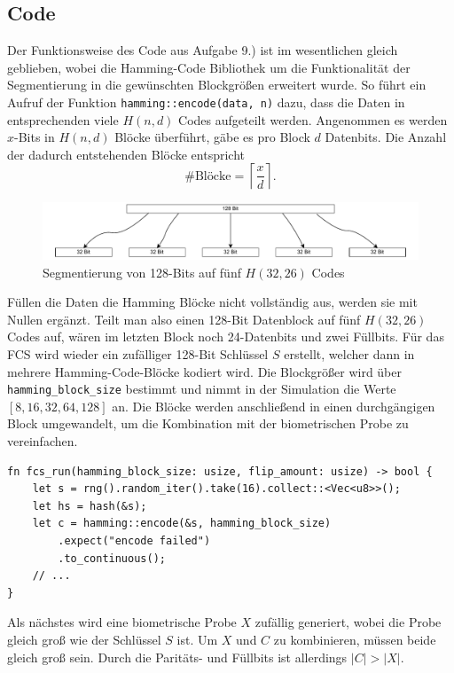 \documentclass{article}
\begin{document}
    \subsection{Code}
    Der Funktionsweise des Code aus Aufgabe 9.) ist im wesentlichen gleich geblieben, wobei die Hamming-Code Bibliothek um die 
    Funktionalität der Segmentierung in die gewünschten Blockgrößen erweitert wurde. So führt ein Aufruf
    der Funktion \verb|hamming::encode(data, n)| dazu, dass die Daten in entsprechenden viele $H(n,d)$ Codes
    aufgeteilt werden. Angenommen es werden $x$-Bits in $H(n,d)$ Blöcke überführt, gäbe es pro Block $d$ Datenbits.
    Die Anzahl der dadurch entstehenden Blöcke entspricht
    \begin{equation} \label{eq:1}
        \#\text{Blöcke}=\left\lceil\frac{x}{d}\right\rceil.
    \end{equation}
    \begin{figure}[h]
        \includegraphics[width=\textwidth]{img/segmentation.pdf}
        \caption{Segmentierung von 128-Bits auf fünf $H(32,26)$ Codes}
        \label{fig:segmentation}
    \end{figure}
    Füllen die Daten die Hamming Blöcke nicht vollständig aus, werden sie mit Nullen ergänzt. Teilt man also einen
    128-Bit Datenblock auf fünf $H(32,26)$ Codes auf, wären im letzten Block noch 24-Datenbits und zwei Füllbits.
    Für das FCS wird wieder ein zufälliger 128-Bit Schlüssel $S$ erstellt, welcher dann in mehrere Hamming-Code-Blöcke kodiert wird.
    Die Blockgrößer wird über \verb|hamming_block_size| bestimmt und nimmt in der Simulation die Werte $\left[8,16,32,64,128\right]$
    an. Die Blöcke werden anschließend in einen durchgängigen Block umgewandelt, um die Kombination mit der biometrischen Probe
    zu vereinfachen.
    \begin{verbatim}
fn fcs_run(hamming_block_size: usize, flip_amount: usize) -> bool {
    let s = rng().random_iter().take(16).collect::<Vec<u8>>();
    let hs = hash(&s);
    let c = hamming::encode(&s, hamming_block_size)
        .expect("encode failed")
        .to_continuous();
    // ...
}
    \end{verbatim}
    Als nächstes wird eine biometrische Probe $X$ zufällig generiert, wobei die Probe gleich groß wie der Schlüssel $S$ ist.
    Um $X$ und $C$ zu kombinieren, müssen beide gleich groß sein. Durch die Paritäts- und Füllbits ist allerdings $|C|>|X|$.
\end{document}
